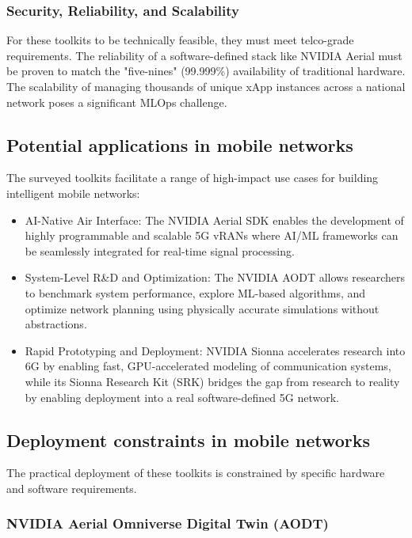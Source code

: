 \documentclass[conference]{IEEEtran}
\begin{document}
\subsubsection{Security, Reliability, and Scalability}
For these toolkits to be technically feasible, they must meet telco-grade requirements. The reliability of a software-defined stack like NVIDIA Aerial must be proven to match the "five-nines" (99.999\%) availability of traditional hardware. The scalability of managing thousands of unique xApp instances across a national network poses a significant MLOps challenge.

\subsection{Potential applications in mobile networks}
The surveyed toolkits facilitate a range of high-impact use cases for building intelligent mobile networks:

\begin{itemize}
\item AI-Native Air Interface: The NVIDIA Aerial SDK enables the development of highly programmable and scalable 5G vRANs where AI/ML frameworks can be seamlessly integrated for real-time signal processing.

\item System-Level R\&D and Optimization: The NVIDIA AODT allows researchers to benchmark system performance, explore ML-based algorithms, and optimize network planning using physically accurate simulations without abstractions.

\item Rapid Prototyping and Deployment: NVIDIA Sionna accelerates research into 6G by enabling fast, GPU-accelerated modeling of communication systems, while its Sionna Research Kit (SRK) bridges the gap from research to reality by enabling deployment into a real software-defined 5G network.
\end{itemize}

\subsection{Deployment constraints in mobile networks}

The practical deployment of these toolkits is constrained by specific hardware and software requirements.

\subsubsection{NVIDIA Aerial Omniverse Digital Twin (AODT)}
\end{document}
